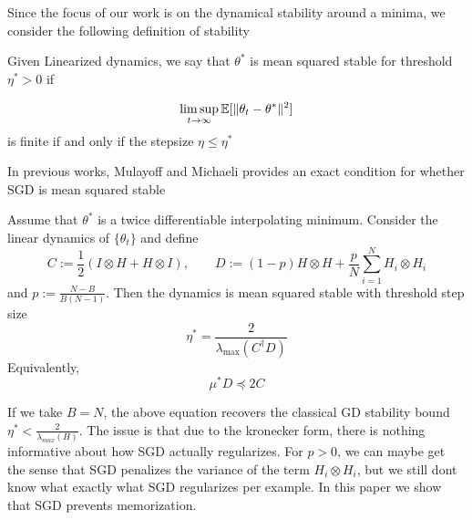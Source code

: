 Since the focus of our work is on the dynamical stability around a minima, we consider the following definition of stability

\begin{definition}
Given Linearized dynamics, we say that $\theta^*$ is mean squared stable for threshold $\eta^* > 0$ if 

\begin{equation}
    \limsup_{t\rightarrow \infty} \mathbb{E} [\|\theta_t - \theta^*\|^2]
\end{equation}
is finite if and only if the stepsize $\eta \leq \eta^*$
\end{definition}

In previous works, Mulayoff and Michaeli provides an exact condition for whether SGD is mean squared stable

\begin{theorem}
Assume that $\theta^*$ is a twice differentiable interpolating minimum. Consider the linear dynamics of $\{\theta_t\}$ and define
\begin{equation}
    C := \frac{1}{2} (I\otimes H + H\otimes I), \qquad D:= (1-p)H\otimes H + \frac{p}{N}\sum_{i=1}^N H_i \otimes H_i
\end{equation}
and $p:= \frac{N-B}{B(N-1)}$. Then the dynamics is mean squared stable with threshold step size 
\begin{equation}
\eta^* = \frac{2}{\lambda_{\text{max}} (C^\dagger D)}
\end{equation}
Equivalently,
\begin{equation}
    \mu^*D \preceq 2C
\end{equation}
\end{theorem}

If we take $B = N$, the above equation recovers the classical GD stability bound $\eta^* < \frac{2}{\lambda_{max}(H)}$. The issue is that due to the kronecker form, there is nothing informative about how SGD actually regularizes. For $p>0$, we can maybe get the sense that SGD penalizes the variance of the term $H_i \otimes H_i$, but we still dont know what exactly what SGD regularizes per example. In this paper we show that SGD prevents memorization.